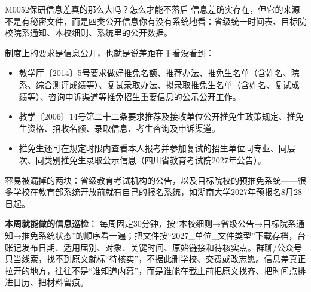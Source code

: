 \begin{qa}{M0052}{保研信息差真的那么大吗？怎么才能不落后}
信息差确实存在，但它的来源不是有秘密文件，而是四类公开信息你有没有系统地看：省级统一时间表、目标院校院系通知、本校细则、系统里的公开数据。

制度上的要求是信息公开，也就是说差距在于看没看到：
\begin{itemize}
  \item 教学厅〔2014〕5号要求做好推免名额、推荐办法、推免生名单（含姓名、院系、综合测评成绩等）、复试录取办法、拟录取推免生名单（含姓名、复试成绩等）、咨询申诉渠道等推免招生重要信息的公示公开工作。
  \item 教学〔2006〕14号第二十二条要求推荐及接收单位公开推免生政策规定、推免生资格、招收名额、录取信息、考生咨询及申诉渠道。
  \item 推免生还可在规定时限内查看本人报考并参加复试的招生单位同专业、同层次、同类别推免生录取公示信息（四川省教育考试院2027年公告）。
\end{itemize}

容易被漏掉的两块：省级教育考试机构的公告，以及目标院校的预推免系统——很多学校在教育部系统开放前就有自己的报名系统，如湖南大学2027年预报名8月28日起。

\textbf{本周就能做的信息巡检：} 每周固定30分钟，按“本校细则→省级公告→目标院系通知→推免系统状态”的顺序看一遍；把文件按“2027\_单位\_文件类型”下载存档，台账记发布日期、适用届别、对象、关键时间、原始链接和待核实点。群聊/公众号只当线索，找不到原文就标“待核实”，不据此删学校、交费或改志愿。信息差真正拉开的地方，往往不是“谁知道内幕”，而是谁能在截止前把原文找齐、把时间点排进日历、把材料留痕。
\end{qa}

